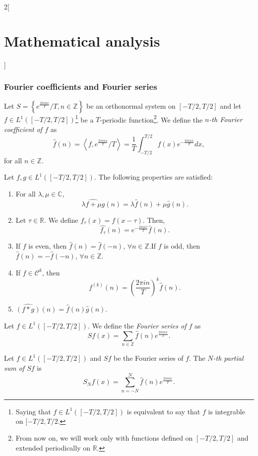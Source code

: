 \documentclass[class=article,crop=false]{standalone}
\begin{document}
\begin{multicols}{2}[\section{Mathematical analysis}]
\subsubsection*{Fourier coefficients and Fourier series}
\begin{definition}
Let $\displaystyle S=\left\{e^{\frac{2\pi inx}{T}}/T,n\in\mathbb{Z}\right\}$ be an or\-tho\-nor\-mal system on $[-T/2,T/2]$ and let $f\in L^1([-T/2,T/2])$\footnote{Saying that $f\in L^1([-T/2,T/2])$ is equivalent to say that $f$ is integrable on $[-T/2,T/2$.} be a $T$-periodic function\footnote{From now on, we will work only with functions defined on $[-T/2,T/2]$ and extended periodically on $\mathbb{R}$.}. We define the \textit{$n$-th Fourier coefficient of $f$} as $$\widehat{f}(n)=\left\langle f,e^{\frac{2\pi inx}{T}}/T\right\rangle=\frac{1}{T}\int_{-T/2}^{T/2}f(x)e^{-\frac{2\pi inx}{T}}dx,$$ for all $n\in\mathbb{Z}$.
\end{definition}
\begin{prop}
Let $f,g\in L^1([-T/2,T/2])$. The following properties are satisfied:
\begin{enumerate}
    \item For all $\lambda,\mu\in\mathbb{C}$, $$\widehat{\lambda f+\mu g}(n)=\lambda\widehat{f}(n)+\mu\widehat{g}(n).$$
    \item Let $\tau\in\mathbb{R}$. We define $f_\tau(x)=f(x-\tau)$. Then, $$\widehat{f_\tau}(n)=e^{-\frac{2\pi in\tau}{T}}\widehat{f}(n).$$
    \item If $f$ is even, then $\widehat{f}(n)=\widehat{f}(-n)$, $\forall n\in\mathbb{Z}$.\newline If $f$ is odd, then $\widehat{f}(n)=-\widehat{f}(-n)$, $\forall n\in\mathbb{Z}$. 
    \item If $f\in \mathcal{C}^k$, then $$\widehat{f^{(k)}}(n)=\left(\frac{2\pi in}{T}\right)^k\widehat{f}(n).$$
    \item $\widehat{(f*g)}(n)=\widehat{f}(n)\widehat{g}(n)$.
\end{enumerate}
\end{prop}
\begin{definition}
Let $f\in L^1([-T/2,T/2])$. We define the \textit{Fourier series of $f$} as $$\displaystyle Sf(x)=\sum_{n\in\mathbb{Z}}\widehat{f}(n)e^{\frac{2\pi inx}{T}}.$$
\end{definition}
\begin{definition}
Let $f\in L^1([-T/2,T/2])$ and $Sf$ be the Fourier series of $f$. The \textit{$N$-th partial sum of $Sf$} is $$S_Nf(x)=\sum_{n=-N}^N\widehat{f}(n)e^{\frac{2\pi inx}{T}}.$$

\end{definition}
\end{multicols}
\end{document}
